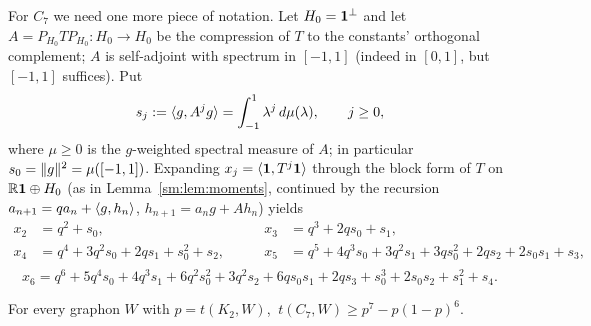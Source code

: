 For $C_7$ we need one more piece of notation.  Let $H_0=\mathbf 1^{\perp}$ and let
$A=P_{H_0}TP_{H_0}\colon H_0\to H_0$ be the compression of $T$ to the
constants' orthogonal complement; $A$ is self-adjoint with spectrum in
$[-1,1]$ (indeed in $[0,1]$, but $[-1,1]$ suffices).  Put
\[
   s_j:=\langle g,A^{j}g\rangle=\int_{-1}^{1}\lambda^{j}\,d\mu(\lambda),
   \qquad j\ge0,
\]
where $\mu\ge0$ is the $g$-weighted spectral measure of $A$; in particular
$s_0=\lVert g\rVert^{2}=\mu([-1,1])$.  Expanding
$x_j=\langle \mathbf 1,T^{j}\mathbf 1\rangle$ through the block form of $T$ on
$\mathbb R\mathbf 1\oplus H_0$ (as in Lemma~\ref{sm:lem:moments}, continued by the
recursion $a_{n+1}=qa_n+\langle g,h_n\rangle$, $h_{n+1}=a_ng+Ah_n$) yields
\[
\begin{aligned}
   x_2&=q^{2}+s_0, & x_3&=q^{3}+2qs_0+s_1,\\
   x_4&=q^{4}+3q^{2}s_0+2qs_1+s_0^{2}+s_2,\qquad
   & x_5&=q^{5}+4q^{3}s_0+3q^{2}s_1+3qs_0^{2}+2qs_2+2s_0s_1+s_3,\\
\end{aligned}
\]
\[
   x_6=q^{6}+5q^{4}s_0+4q^{3}s_1+6q^{2}s_0^{2}+3q^{2}s_2
       +6qs_0s_1+2qs_3+s_0^{3}+2s_0s_2+s_1^{2}+s_4 .
\]

\begin{theorem}\label{sm:thm:C7}
For every graphon $W$ with $p=t(K_2,W)$,
$\ t(C_7,W)\ge p^{7}-p(1-p)^{6}.$
\end{theorem}

